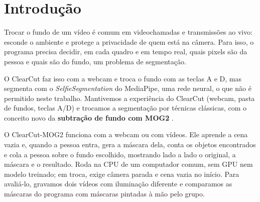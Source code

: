 \section{Introdução}
\label{sec:introducao}

Trocar o fundo de um vídeo é comum em videochamadas e transmissões ao
vivo: esconde o ambiente e protege a privacidade de quem está na câmera.
Para isso, o programa precisa decidir, em cada quadro e em tempo real,
quais pixels são da pessoa e quais são do fundo, um problema de
segmentação.

O ClearCut \citep{clearcut} faz isso com a webcam e troca o fundo com as
teclas A e D, mas segmenta com o \textit{SelfieSegmentation} do
MediaPipe, uma rede neural, o que não é permitido neste trabalho.
Mantivemos a experiência do ClearCut (webcam, pasta de fundos, teclas
A/D) e trocamos a segmentação por técnicas clássicas, com o conceito
novo da \textbf{subtração de fundo com MOG2}
\citep{zivkovic2004,opencv_tutorial_bgsub}.

O ClearCut-MOG2 funciona com a webcam ou com vídeos. Ele aprende a cena
vazia e, quando a pessoa entra, gera a máscara dela, conta os objetos
encontrados e cola a pessoa sobre o fundo escolhido, mostrando lado a
lado o original, a máscara e o resultado. Roda na CPU de um computador
comum, sem GPU nem modelo treinado; em troca, exige câmera parada e cena
vazia no início. Para avaliá-lo, gravamos dois vídeos com iluminação
diferente e comparamos as máscaras do programa com máscaras pintadas à
mão pelo grupo.
